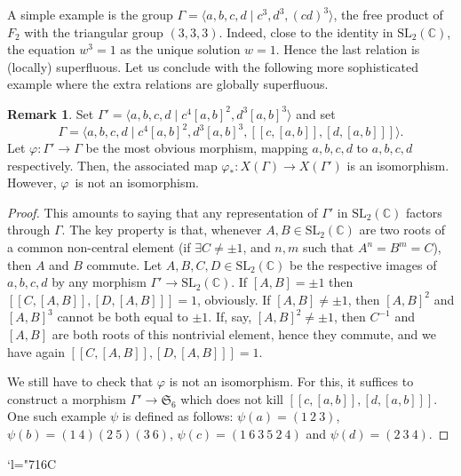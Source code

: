 \documentclass[JEP,XML,SOM,Unicode,NoEqCountersInSection]{cedram}
\newcommand{\Changelback}{\mathcode`l="716C}
\theoremstyle{definition}
\newtheorem{remark}[theorem]{Remark}
\newcommand{\CC}{\mathbb{C}}
\newcommand{\SL}{\mathrm{SL}}
\begin{document}
A simple example is the group
$\Gamma=\langle a,b,c,d\mid c^3,d^3,(cd)^3\rangle$, the free product of~$F_2$ with the triangular group $(3,3,3)$. Indeed, close to the identity
in $\SL_2(\CC)$, the equation $w^3=1$ as the unique solution $w=1$.
Hence the last relation is (locally) superfluous. Let us conclude with the
following more sophisticated example where the extra relations are globally
superfluous.

\begin{remark}
Set $\Gamma'=\langle a,b,c,d\mid c^4[a,b]^2, d^3[a,b]^3\rangle$ and set
\[ \Gamma=\langle a,b,c,d\mid c^4[a,b]^2, d^3[a,b]^3,
[[ c,[a,b]],[d,[a,b]]]\rangle. \]
Let $\varphi\colon\Gamma'\to\Gamma$ be the most obvious morphism,
mapping $a,b,c,d$ to $a,b,c,d$ respectively.
Then, the associated map $\varphi_*\colon X(\Gamma)\to X(\Gamma')$
is an isomorphism. However, $\varphi$~is not an isomorphism.
\end{remark}

\begin{proof}
This amounts to saying that any representation of $\Gamma'$ in $\SL_2(\CC)$
factors through $\Gamma$. The key property is that, whenever
$A,B\in\SL_2(\CC)$ are two roots of a common non-central element
(\ie if $\exists C\neq \pm1$, and $n,m$ such that $A^n=B^m=C$),
then $A$ and $B$ commute. Let $A,B,C,D\in\SL_2(\CC)$ be the respective
images of $a,b,c,d$ by any morphism $\Gamma'\to\SL_2(\CC)$. If $[A,B]=\pm1$
then $[[ C,[A,B]],[D,[A,B]]]=1$, obviously.
If $[A,B]\neq \pm1$, then $[A,B]^2$ and $[A,B]^3$ cannot be both equal
to $\pm 1$. If, say, $[A,B]^2\neq \pm 1$, then
$C^{-1}$ and $[A,B]$ are both roots of this nontrivial element, hence they
commute, and we have again $[[ C,[A,B]],[D,[A,B]]]=1$.

We still have to check that $\varphi$ is not an isomorphism. For this, it
suffices to construct a morphism $\Gamma'\to \mathfrak{S}_6$
which does not kill
$[[ c,[a,b]],[d,[a,b]]]$. One such example $\psi$ is defined as follows:
$\psi(a)=(1~2~3)$, $\psi(b)=(1~4)(2~5)(3~6)$, $\psi(c)=(1~6~3~5~2~4)$
and $\psi(d)=(2~3~4)$.
\end{proof}

\Changelback
\backmatter


\end{document}
